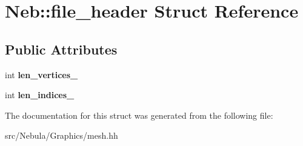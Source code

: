 \hypertarget{structNeb_1_1file__header}{\section{\-Neb\-:\-:file\-\_\-header \-Struct \-Reference}
\label{structNeb_1_1file__header}
}
\subsection*{\-Public \-Attributes}
\begin{DoxyCompactItemize}
\item 
\hypertarget{structNeb_1_1file__header_aeb806255496ccbd26327a962d308a314}{int {\bfseries len\-\_\-vertices\-\_\-}}\label{structNeb_1_1file__header_aeb806255496ccbd26327a962d308a314}

\item 
\hypertarget{structNeb_1_1file__header_ac7e0c2f819a800e70c6d24a04f99b884}{int {\bfseries len\-\_\-indices\-\_\-}}\label{structNeb_1_1file__header_ac7e0c2f819a800e70c6d24a04f99b884}

\end{DoxyCompactItemize}


\-The documentation for this struct was generated from the following file\-:\begin{DoxyCompactItemize}
\item 
src/\-Nebula/\-Graphics/mesh.\-hh\end{DoxyCompactItemize}
